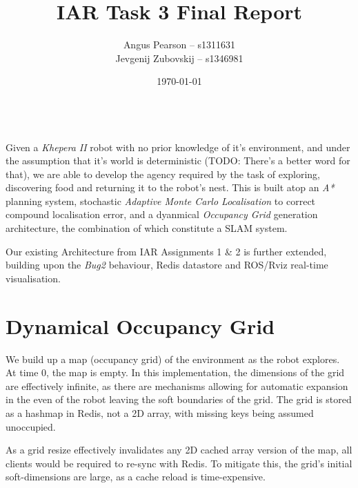 \documentclass[11pt, a4paper]{article}
\renewenvironment{abstract}{%
{\mdseries\scshape\Large\abstractname}
\vspace{1em}\\
}{\par\noindent}
\begin{document}
\title{IAR Task 3 Final Report}
\author{Angus Pearson -- s1311631\\ Jevgenij Zubovskij -- s1346981}
\date{\today}
\maketitle



\begin{abstract}
Given a \textit{Khepera II} robot with no prior knowledge of it's environment, and under the 
assumption that it's world is deterministic (TODO: There's a better word for that), we are able 
to develop the agency required by the task of exploring, discovering food and returning it to the 
robot's nest. This is built atop an \textit{A*} planning system, stochastic \textit{Adaptive Monte Carlo 
Localisation}\cite{principlesrobot} to correct compound localisation error, and a dyanmical 
\textit{Occupancy Grid} generation architecture, the combination of which constitute a SLAM system.

Our existing Architecture from IAR Assignments 1\cite{task1_report} \& 2\cite{task2_report} is further
extended, building upon the \textit{Bug2} behaviour, Redis datastore and ROS/Rviz real-time 
visualisation.

\end{abstract}




\section{Dynamical Occupancy Grid}

We build up a map (occupancy grid) of the environment as the robot explores. At time 0, the map
is empty. In this implementation, the dimensions of the grid are effectively infinite, as there are
mechanisms allowing for automatic expansion in the even of the robot leaving the soft boundaries of
the grid. The grid is stored as a hashmap in Redis, not a 2D array, with missing keys being assumed 
unoccupied.

As a grid resize effectively invalidates any 2D cached array version of the map, all clients 
would be required to re-sync with Redis. To mitigate this, the grid's initial soft-dimensions
are large, as a cache reload is time-expensive.
\end{document}
